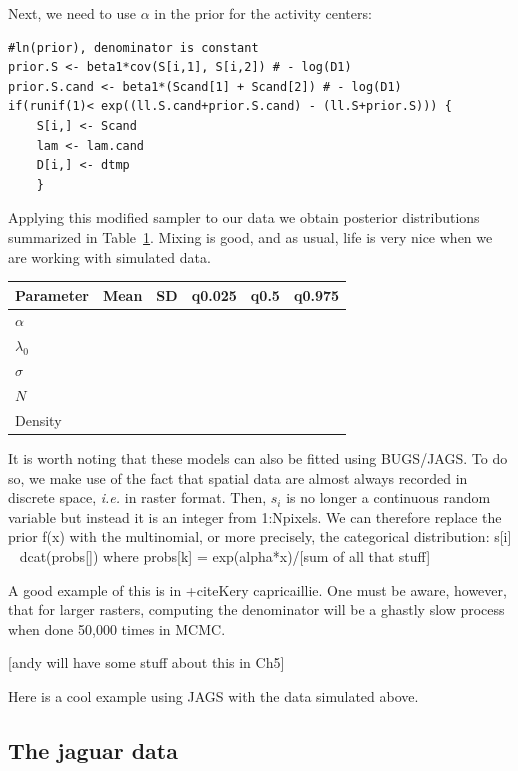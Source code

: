 Next, we need to use $\alpha$ in the prior for the activity centers:

\begin{small}
\begin{verbatim}
#ln(prior), denominator is constant
prior.S <- beta1*cov(S[i,1], S[i,2]) # - log(D1)
prior.S.cand <- beta1*(Scand[1] + Scand[2]) # - log(D1)
if(runif(1)< exp((ll.S.cand+prior.S.cand) - (ll.S+prior.S))) {
    S[i,] <- Scand
    lam <- lam.cand
    D[i,] <- dtmp
    }
\end{verbatim}
\end{small}

Applying this modified sampler to our data we obtain posterior
distributions summarized in Table~\ref{tab:simIPP}. Mixing is good, and as usual,
life is very nice when we are working with simulated data.

\begin{table}
\centering
\begin{tabular}{lccccc}
Parameter & Mean & SD  & q0.025 & q0.5 & q0.975 \\
\hline
$\alpha$    &&&&& \\
$\lambda_0$  &&&&& \\
$\sigma$    &&&&& \\
$N$        &&&&& \\
Density     &&&&& \\
\hline
\end{tabular}
\label{tab:simIPP}
\end{table}

It is worth noting that these models can also be fitted using
BUGS/JAGS. To do so, we make use of the fact that spatial data are
almost always recorded in discrete space, \emph{i.e.} in raster
format. Then, $s_i$ is no longer a continuous random variable but
instead it is an integer from 1:Npixels. We can therefore replace the
prior f(x) with the multinomial, or more precisely, the categorical
distribution:
s[i] ~ dcat(probs[])
where
probs[k] = exp(alpha*x)/[sum of all that stuff]

A good example of this is in +cite{Kery capricaillie}. One must be
aware, however, that for larger rasters, computing the denominator
will be a ghastly slow process when done 50,000 times in MCMC. 

[andy will have some stuff about this in Ch5]

Here is a cool example using JAGS with the data simulated above.


\subsection{The jaguar data}

